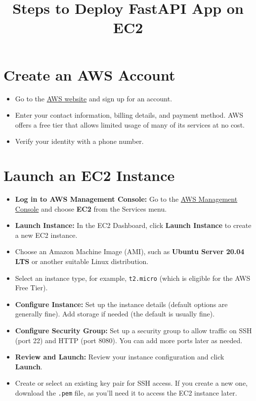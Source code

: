 \documentclass{article}
\title{Steps to Deploy FastAPI App on EC2}
\author{}
\date{}
\begin{document}
\maketitle

\section{Create an AWS Account}
\begin{itemize}
    \item Go to the \href{https://aws.amazon.com/}{AWS website} and sign up for an account.
    \item Enter your contact information, billing details, and payment method. AWS offers a free tier that allows limited usage of many of its services at no cost.
    \item Verify your identity with a phone number.
\end{itemize}

\section{Launch an EC2 Instance}
\begin{itemize}
    \item \textbf{Log in to AWS Management Console:} Go to the \href{https://aws.amazon.com/console/}{AWS Management Console} and choose \textbf{EC2} from the Services menu.
    \item \textbf{Launch Instance:} In the EC2 Dashboard, click \textbf{Launch Instance} to create a new EC2 instance.
    \item Choose an Amazon Machine Image (AMI), such as \textbf{Ubuntu Server 20.04 LTS} or another suitable Linux distribution.
    \item Select an instance type, for example, \texttt{t2.micro} (which is eligible for the AWS Free Tier).
    \item \textbf{Configure Instance:} Set up the instance details (default options are generally fine). Add storage if needed (the default is usually fine).
    \item \textbf{Configure Security Group:} Set up a security group to allow traffic on SSH (port 22) and HTTP (port 8080). You can add more ports later as needed.
    \item \textbf{Review and Launch:} Review your instance configuration and click \textbf{Launch}.
    \item Create or select an existing key pair for SSH access. If you create a new one, download the \texttt{.pem} file, as you’ll need it to access the EC2 instance later.
\end{itemize}
\end{document}
